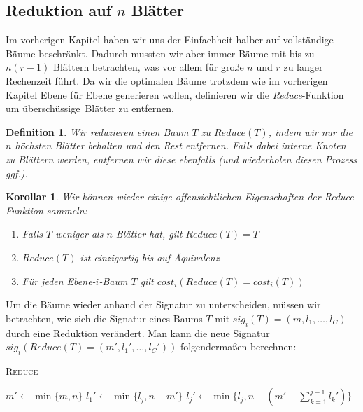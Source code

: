 \documentclass[a4paper,10pt,ngerman]{scrartcl}
\newtheorem{definition}[satz]{Definition}
\newtheorem{korollar}[satz]{Korollar}
\begin{document}
    \subsection{Reduktion auf $n$ Blätter}
    Im vorherigen Kapitel haben wir uns der Einfachheit halber auf vollständige Bäume beschränkt.
    Dadurch mussten wir aber immer Bäume mit bis zu $n(r - 1)$ Blättern betrachten, was vor allem für große $n$ und $r$ zu langer Rechenzeit führt.
    Da wir die optimalen Bäume trotzdem wie im vorherigen Kapitel Ebene für Ebene generieren wollen, definieren wir die \textit{Reduce}-Funktion um \glqq überschüssige\grqq~Blätter zu entfernen.
    \begin{definition}
        Wir reduzieren einen Baum $T$ zu $Reduce(T)$, indem wir nur die $n$ höchsten Blätter behalten und den Rest entfernen.
        Falls dabei interne Knoten zu Blättern werden, entfernen wir diese ebenfalls (und wiederholen diesen Prozess ggf.).
    \end{definition}
    \begin{korollar}
        Wir können wieder einige offensichtlichen Eigenschaften der \textit{Reduce}-Funktion sammeln:
        \begin{enumerate}
            \item Falls $T$ weniger als $n$ Blätter hat, gilt $Reduce(T) = T$
            \item $Reduce(T)$ ist einzigartig bis auf Äquivalenz
            \item Für jeden Ebene-$i$-Baum $T$ gilt $cost_i(Reduce(T) = cost_i(T))$
        \end{enumerate}
    \end{korollar}
    Um die Bäume wieder anhand der Signatur zu unterscheiden, müssen wir betrachten, wie sich die Signatur eines Baums $T$ mit $sig_i(T) = (m, l_1, \dots, l_C)$ durch eine Reduktion verändert.
    Man kann die neue Signatur $sig_i(Reduce(T) = (m', l_1', \dots, l_C'))$ folgendermaßen berechnen: \\
    \begin{algorithm} [H]
        \caption{\textsc{Reduce}}
        \label{alg:reduce}
        \begin{algorithmic}[1]
            \State $m' \gets \min\{m, n\}$
            \State $l_1' \gets \min\{l_j, n - m'\}$
                \State $l_j' \gets \min\{l_j, n - (m' + \sum^{j-1}_{k=1}l_k')\}$
            \EndFor
        \end{algorithmic}
    \end{algorithm}
\end{document}
